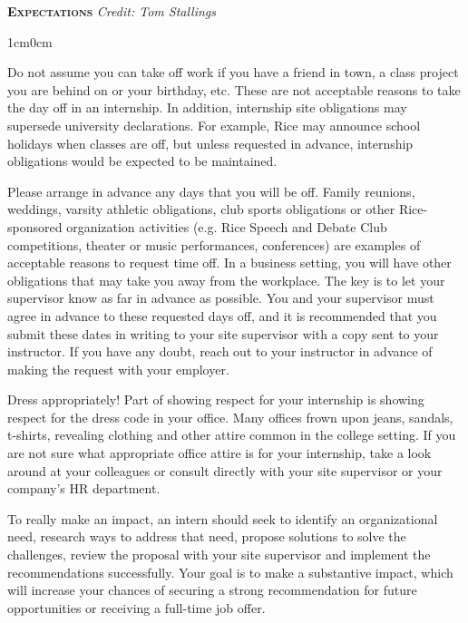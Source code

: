 \documentclass[11pt]{article}
\begin{document}
\newpage

\textbf{\textsc{Expectations}} \hspace{1cm} {\it Credit: Tom Stallings}
\begin{adjustwidth}{1cm}{0cm}

  Do not assume you can take off work if you have a friend in town, a class project you are behind on or your birthday, etc. These are not acceptable reasons to take the day off in an internship. In addition, internship site obligations may supersede university declarations. For example, Rice may announce school holidays when classes are off, but unless requested in advance, internship obligations would be expected to be maintained.

  Please arrange in advance any days that you will be off. Family reunions, weddings, varsity athletic obligations, club sports obligations or other Rice-sponsored organization activities (e.g. Rice Speech and Debate Club competitions, theater or music performances, conferences) are examples of acceptable reasons to request time off. In a business setting, you will have other obligations that may take you away from the workplace. The key is to let your supervisor know as far in advance as possible. You and your supervisor must agree in advance to these requested days off, and it is recommended that you submit these dates in writing to your site supervisor with a copy sent to your instructor. If you have any doubt, reach out to your instructor in advance of making the request with your employer.

  Dress appropriately! Part of showing respect for your internship is showing respect for the dress code in your office. Many offices frown upon jeans, sandals, t-shirts, revealing clothing and other attire common in the college setting. If you are not sure what appropriate office attire is for your internship, take a look around at your colleagues or consult directly with your site supervisor or your company's HR department.

  To really make an impact, an intern should seek to identify an organizational need, research ways to address that need, propose solutions to solve the challenges, review the proposal with your site supervisor and implement the recommendations successfully. Your goal is to make a substantive impact, which will increase your chances of securing a strong recommendation for future opportunities or receiving a full-time job offer.
\end{adjustwidth}
\end{document}
